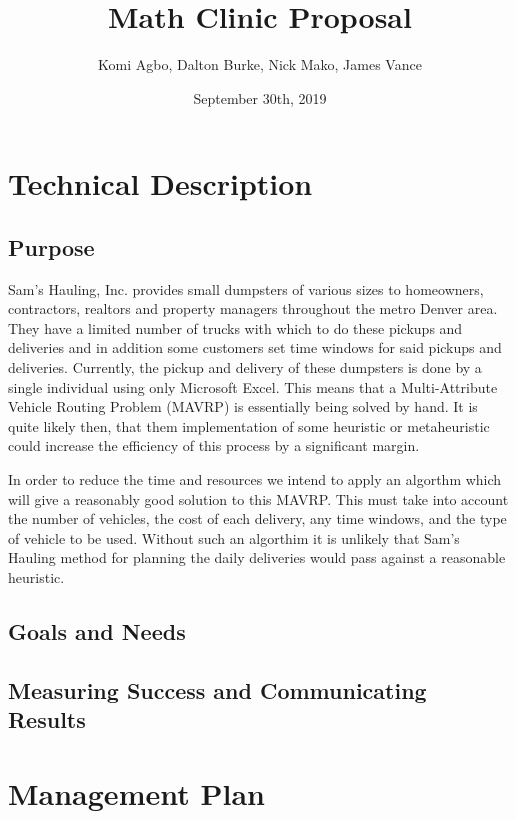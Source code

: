 \documentclass{article}
\title{Math Clinic Proposal}
\author{Komi Agbo, Dalton Burke, Nick Mako, James Vance}
\date{September 30th, 2019}
\begin{document}
\maketitle
\newpage

\section{Technical Description}

\subsection{Purpose}
 Sam’s Hauling, Inc. provides small dumpsters of various sizes to homeowners, contractors, realtors and property managers throughout the metro Denver area. They have a limited number of trucks with which to do these pickups and deliveries and in addition some customers set time windows for said pickups and deliveries. Currently, the pickup and delivery of these dumpsters is done by a single individual using only Microsoft Excel. This means that a Multi-Attribute Vehicle Routing Problem (MAVRP) is essentially being solved by hand. It is quite likely then, that them implementation of some heuristic or metaheuristic could increase the efficiency of this process by a significant margin.
 
 In order to reduce the time and resources we intend to apply an algorthm which will give a reasonably good solution to this MAVRP. This must take into account the number of vehicles, the cost of each delivery, any time windows, and the type of vehicle to be used. Without such an algorthim it is unlikely that Sam's Hauling method for planning the daily deliveries would pass against a reasonable heuristic.

\subsection{Goals and Needs}

\subsection{Measuring Success and Communicating Results}

\section{Management Plan}
\end{document}
